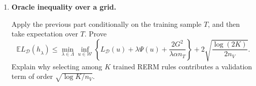 \documentclass[11pt]{article}
\newcommand{\E}{\mathbb{E}}
\begin{document}
\begin{enumerate}
\begin{solutionbox}
\[
\mathbb E_V
\left[
\max_{j\in[K]}
|Z_j|
\right]
\le
\sqrt{
\frac{\log(2K)}
{2n_V}
}.
\]

\medskip

\textbf{Step 5: Take expectation over the validation sample.}

Taking expectation over the validation sample \(V\) in the comparison inequality from Step 3 yields

\[
\mathbb E_V
L_{\mathcal D}(h_{\widehat{k}})
\le
\min_{k\in[K]}
L_{\mathcal D}(h_k)
+
2
\mathbb E_V
\left[
\max_{j\in[K]}
|Z_j|
\right].
\]

Substituting the maximum-deviation bound from Step 4 gives

\[
\mathbb E_V
L_{\mathcal D}(h_{\widehat{k}})
\le
\min_{k\in[K]}
L_{\mathcal D}(h_k)
+
2
\sqrt{
\frac{\log(2K)}
{2n_V}
}.
\]

Therefore,

\[
\boxed{
\mathbb E_V
L_{\mathcal D}(h_{\widehat{k}})
\le
\min_{k\in[K]}
L_{\mathcal D}(h_k)
+
2
\sqrt{
\frac{\log(2K)}
{2n_V}
}
}.
\]

\medskip

\textbf{Interpretation.}

This theorem shows that validation-based model selection is statistically efficient. Even when comparing many candidate predictors, the additional cost grows only logarithmically with the number of candidates.

Specifically, the model-selection penalty scales as

\[
O\!\left(
\sqrt{
\frac{\log K}
{n_V}
}
\right).
\]

Thus, provided the validation sample is sufficiently large, choosing the predictor with the smallest validation error produces a predictor whose true risk is nearly as good as the best predictor in the candidate collection.

\end{solutionbox}

\item \textbf{Oracle inequality over a grid.}

Apply the previous part conditionally on the training sample $T$, and then take expectation over $T$. Prove
\[
\E L_{\mathcal D}(h_{\widehat\lambda})
\le
\min_{\lambda\in\Lambda}\inf_{u\in\mathcal W}
\left\{
L_{\mathcal D}(u)+\lambda\Psi(u)+\frac{2G^2}{\lambda\alpha n_T}
\right\}
+
2\sqrt{\frac{\log(2K)}{2n_V}}.
\]
Explain why selecting among $K$ trained RERM rules contributes a validation term of order $\sqrt{\log K/n_V}$.


\end{enumerate}
\end{document}
